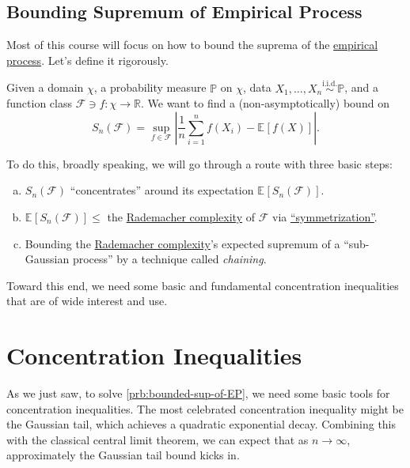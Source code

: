 \section{Bounding Supremum of Empirical Process}
Most of this course will focus on how to bound the suprema of the \hyperref[def:EP]{empirical process}. Let's define it rigorously.

\begin{problem}\label{prb:bounded-sup-of-EP}
Given a domain \(\chi \), a probability measure \(\mathbb{P} \) on \(\chi \), data \(X_1, \dots , X_n \overset{\text{i.i.d.} }{\sim } \mathbb{P} \), and a function class \(\mathscr{F}\ni f \colon \chi \to \mathbb{R}  \). We want to find a (non-asymptotically) bound on
\[
	S_n(\mathscr{F} ) = \sup _{f\in \mathscr{F} } \left\vert \frac{1}{n} \sum_{i=1}^{n} f(X_i) - \mathbb{E}_{}\left[f(X) \right]  \right\vert.
\]
\end{problem}
\begin{answer}
	To do this, broadly speaking, we will go through a route with three basic steps:
	\begin{enumerate}[(a)]
		\item \(S_n(\mathscr{F} )\) ``concentrates'' around its expectation \(\mathbb{E}_{}\left[S_n(\mathscr{F} ) \right] \).
		\item \(\mathbb{E}_{}\left[S_n(\mathscr{F} ) \right] \leq \) the \hyperref[def:Rademacher-complexity]{Rademacher complexity} of \(\mathscr{F} \) via \hyperref[lma:symmetrization]{``symmetrization''}.
		\item Bounding the \hyperref[def:Rademacher-complexity]{Rademacher complexity}'s expected supremum of a ``sub-Gaussian process'' by a technique called \emph{chaining}.
	\end{enumerate}
\end{answer}

Toward this end, we need some basic and fundamental concentration inequalities that are of wide interest and use.

\chapter{Concentration Inequalities}
As we just saw, to solve \autoref{prb:bounded-sup-of-EP}, we need some basic tools for concentration inequalities. The most celebrated concentration inequality might be the Gaussian tail, which achieves a quadratic exponential decay. Combining this with the classical central limit theorem, we can expect that as \(n \to \infty \), approximately the Gaussian tail bound kicks in.

